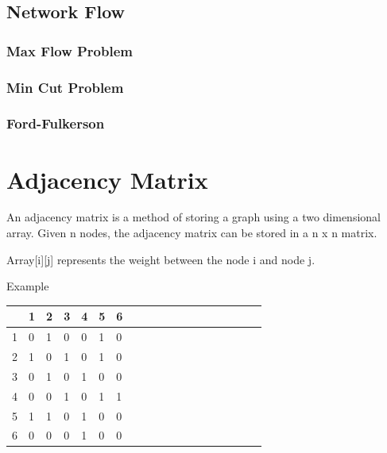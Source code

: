 \documentclass[11pt,oneside]{book}
\begin{document}
\subsection{Network Flow}

\subsubsection{Max Flow Problem}

\subsubsection{Min Cut Problem}

\subsubsection{Ford-Fulkerson}
\section{Adjacency Matrix}

An adjacency matrix is a method of storing a graph using a two dimensional array. Given n nodes, the adjacency matrix can be stored in a n x n matrix.

Array[i][j] represents the weight between the node i and node j.

Example

\vspace{10pt} \begin{tabular}{|l|l|l|l|l|l|l|l|l|l|l|l|l|l|l|l|l|l|l}\hline


   &
  1 &
  2 &
  3 &
  4 &
  5 &
  6\\
\hline


  1 &
  0 &
  1 &
  0 &
  0 &
  1 &
  0\\

  2 &
  1 &
  0 &
  1 &
  0 &
  1 &
  0\\

  3 &
  0 &
  1 &
  0 &
  1 &
  0 &
  0\\

  4 &
  0 &
  0 &
  1 &
  0 &
  1 &
  1\\

  5 &
  1 &
  1 &
  0 &
  1 &
  0 &
  0\\

  6 &
  0 &
  0 &
  0 &
  1 &
  0 &
  0\\

\hline\end{tabular}
\end{document}
